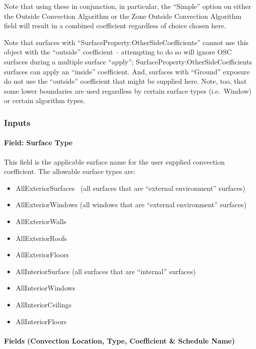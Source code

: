 Note that using these in conjunction, in particular, the ``Simple'' option on either the Outside Convection Algorithm or the Zone Outside Convection Algorithm field will result in a combined coefficient regardless of choice chosen here.

Note that surfaces with ``SurfaceProperty:OtherSideCoefficients'' cannot use this object with the ``outside'' coefficient -- attempting to do so will ignore OSC surfaces during a multiple surface ``apply''; SurfaceProperty:OtherSideCoefficients surfaces can apply an ``inside'' coefficient. And, surfaces with ``Ground'' exposure do not use the ``outside'' coefficient that might be supplied here. Note, too, that some lower boundaries are used regardless by certain surface types (i.e.~Window) or certain algorithm types.

\subsubsection{Inputs}\label{inputs-11}

\paragraph{Field: Surface Type}\label{field-surface-type-1}

This field is the applicable surface name for the user supplied convection coefficient. The allowable surface types are:

\begin{itemize}
\item
  AllExteriorSurfaces~ (all surfaces that are ``external environment'' surfaces)
\item
  AllExteriorWindows (all windows that are ``external environment'' surfaces)
\item
  AllExteriorWalls
\item
  AllExteriorRoofs
\item
  AllExteriorFloors
\item
  AllInteriorSurface (all surfaces that are ``internal'' surfaces)
\item
  AllInteriorWindows
\item
  AllInteriorCeilings
\item
  AllInteriorFloors
\end{itemize}

\paragraph{Fields (Convection Location, Type, Coefficient \& Schedule Name)}\label{fields-convection-location-type-coefficient-schedule-name-1}

